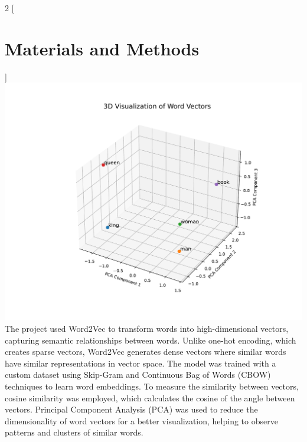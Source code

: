 \begin{multicols}{2}
    [
        \section{Materials and Methods}
    ]
    \includegraphics[trim=2cm 2cm 1cm 3cm, clip, width=\linewidth]{figures/word_vector_example.pdf}
    The project used Word2Vec to transform words into high-dimensional vectors, capturing semantic relationships between words. Unlike one-hot encoding, which creates sparse vectors, Word2Vec generates dense vectors where similar words have similar representations in vector space. The model was trained with a custom dataset using Skip-Gram and Continuous Bag of Words (CBOW) techniques to learn word embeddings.
    To measure the similarity between vectors, cosine similarity was employed, which calculates the cosine of the angle between vectors.
    Principal Component Analysis (PCA) was used to reduce the dimensionality of word vectors for a better visualization, helping to observe patterns and clusters of similar words.

    
\end{multicols}